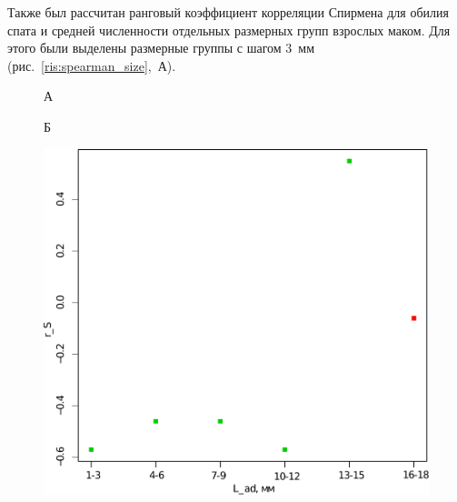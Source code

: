 Также был рассчитан ранговый коэффициент корреляции Спирмена для обилия спата и средней численности отдельных размерных групп взрослых маком. 
Для этого были выделены размерные группы с шагом $3$~мм (рис.~\ref{ris:spearman_size},~А).
	\begin{figure}[p]
	\begin{minipage}[b]{.46\linewidth}
	\begin{center}
	А
	\end{center}
	\end{minipage}
	\hfil %
	\begin{minipage}[b]{.46\linewidth}
	\begin{center}
	Б
	\end{center}
	\end{minipage}
	\begin{minipage}[b]{.46\linewidth}
	\begin{center}
		\includegraphics[width=\textwidth]{../White_Sea/spat/spearman_spat_3mm_1.pdf}
	\end{center}
	\end{minipage}
%
	\hfil %
	\begin{minipage}[b]{.46\linewidth}

\end{minipage}
\end{figure}
